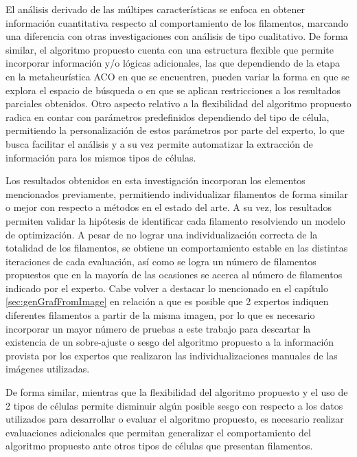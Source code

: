 El an\'alisis derivado de las m\'ultipes caracter\'isticas se enfoca en obtener informaci\'on cuantitativa respecto al comportamiento de los filamentos, marcando una diferencia con otras investigaciones con an\'alisis de tipo cualitativo. De forma similar, el algoritmo propuesto cuenta con una estructura flexible que permite incorporar informaci\'on y/o l\'ogicas adicionales, las que dependiendo de la etapa en la metaheur\'istica ACO en que se encuentren, pueden variar la forma en que se explora el espacio de b\'usqueda o en que se aplican restricciones a los resultados parciales obtenidos. Otro aspecto relativo a la flexibilidad del algoritmo propuesto radica en contar con  par\'ametros predefinidos dependiendo del tipo de c\'elula, permitiendo la personalizaci\'on de estos par\'ametros por parte del experto, lo que busca facilitar el an\'alisis y a su vez permite automatizar la extracci\'on de informaci\'on para los mismos tipos de c\'elulas.


Los resultados obtenidos en esta investigaci\'on incorporan los elementos mencionados previamente, permitiendo individualizar filamentos de forma similar o mejor con respecto a m\'etodos en el estado del arte. A su vez, los resultados permiten validar la hip\'otesis de identificar cada filamento resolviendo un modelo de optimizaci\'on. A pesar de no lograr una individualizaci\'on correcta de la totalidad de los filamentos, se obtiene un comportamiento estable en las distintas iteraciones de cada evaluaci\'on, as\'i como se logra un n\'umero de filamentos propuestos que en la mayor\'ia de las ocasiones se acerca al n\'umero de filamentos indicado por el experto. Cabe volver a destacar lo mencionado en el cap\'itulo \ref{sec:genGrafFromImage} en relaci\'on a que es posible que 2 expertos indiquen diferentes filamentos a partir de la misma imagen, por lo que es necesario incorporar un mayor n\'umero de pruebas a este trabajo para descartar la existencia de un sobre-ajuste o sesgo del algoritmo propuesto a la informaci\'on provista por los expertos que realizaron las individualizaciones manuales de las im\'agenes utilizadas. 


De forma similar, mientras que la flexibilidad del algoritmo propuesto y el uso de 2 tipos de c\'elulas permite disminuir alg\'un posible sesgo con respecto a los datos utilizados para desarrollar o evaluar el algoritmo propuesto, es necesario realizar evaluaciones adicionales que permitan generalizar el comportamiento del algoritmo propuesto ante otros tipos de c\'elulas que presentan filamentos.



